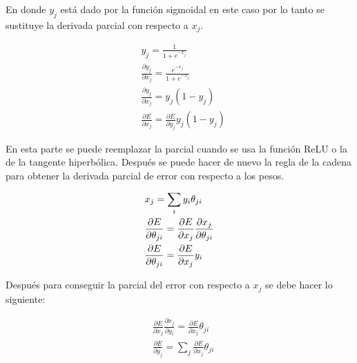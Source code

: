 En donde $y_{j}$ está dado por la función sigmoidal en este caso por lo tanto se sustituye la derivada parcial con respecto a $x_{j}$.
\begin{spreadlines}{10pt}
	\begin{alignat}{4}
		 & y_{j} =\frac{1}{1+e^{-x_{j}}}                                                         \\
		 & \frac{\partial y_{j}}{\partial x_{j}} =\frac{e^{-x_{j}}}{1+e^{-x_{j}}}                \\
		 & \frac{\partial y_{j}}{\partial x_{j}}=y_{j} (1-y_{j})                                 \\
		 & \frac{\partial E}{\partial x_{j}} =\frac{\partial E}{\partial y_{j}}  y_{j}( 1-y_{j})
	\end{alignat}
\end{spreadlines}

\par En esta parte se puede reemplazar la parcial cuando se usa la función \gls{ReLU} o la de la tangente hiperbólica. Después se puede hacer de nuevo la regla de la cadena para obtener la derivada parcial de error con respecto a los pesos.

\begin{spreadlines}{10pt}
	\begin{alignat}{3}
		 & x_{j}=\sum_{i} y_{i}\theta_{ji}                                                                                          \\ \vspace{100pt}
		 & \frac{\partial E}{\partial \theta _{ji}} =\frac{\partial E}{\partial x_{j}} \frac{\partial x_{j}}{\partial \theta _{ji}} \\
		 & \frac{\partial E}{\partial \theta _{ji}} =\frac{\partial E}{\partial x_{j}}y_{i}
	\end{alignat}
\end{spreadlines}

\par Después para conseguir la parcial del error con respecto a $x_{j}$ se debe hacer lo siguiente:

\begin{spreadlines}{10pt}
	\begin{alignat}{3}
		 & \frac{\partial E}{\partial x_{j}} \frac{\partial x_{j}}{\partial y_{i}} =\frac{\partial E}{\partial x_{j}} \theta _{ji} \\
		 & \frac{\partial E}{\partial y_{j}} =\sum _{j}\frac{\partial E}{\partial x_{j}} \theta _{ji}
	\end{alignat}
\end{spreadlines}

